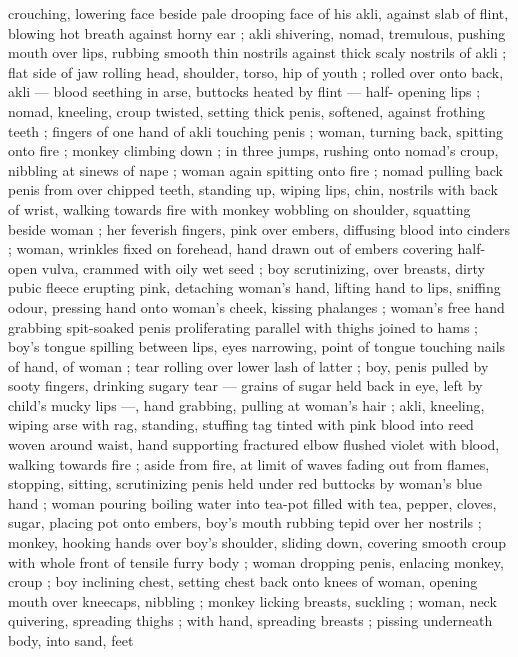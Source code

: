 crouching, lowering face beside pale drooping face of his akli,
against slab of flint, blowing hot breath against horny ear ; akli
shivering, nomad, tremulous, pushing mouth over lips, rubbing
smooth thin nostrils against thick scaly nostrils of akli ; flat side of
jaw rolling head, shoulder, torso, hip of youth ; rolled over onto back,
akli --- blood seething in arse, buttocks heated by flint --- half-
opening lips ; nomad, kneeling, croup twisted, setting thick penis,
softened, against frothing teeth ; fingers of one hand of akli
touching penis ; woman, turning back, spitting onto fire ; monkey
climbing down ; in three jumps, rushing onto nomad’s croup, nibbling
at sinews of nape ; woman again spitting onto fire ; nomad pulling
back penis from over chipped teeth, standing up, wiping lips, chin,
nostrils with back of wrist, walking towards fire with monkey wobbling
on shoulder, squatting beside woman ; her feverish fingers, pink over
embers, diffusing blood into cinders ; woman, wrinkles fixed on
forehead, hand drawn out of embers covering half-open vulva,
crammed with oily wet seed ; boy scrutinizing, over breasts, dirty
pubic fleece erupting pink, detaching woman's hand, lifting hand to
lips, sniffing odour, pressing hand onto woman's cheek, kissing
phalanges ; woman's free hand grabbing spit-soaked penis
proliferating parallel with thighs joined to hams ; boy's tongue
spilling between lips, eyes narrowing, point of tongue touching nails
of hand, of woman ; tear rolling over lower lash of latter ; boy, penis
pulled by sooty fingers, drinking sugary tear --- grains of sugar held
back in eye, left by child's mucky lips ---, hand grabbing, pulling at
woman's hair ; akli, kneeling, wiping arse with rag, standing, stuffing
tag tinted with pink blood into reed woven around waist, hand
supporting fractured elbow flushed violet with blood, walking
towards fire ; aside from fire, at limit of waves fading out from
flames, stopping, sitting, scrutinizing penis held under red buttocks
by woman's blue hand ; woman pouring boiling water into tea-pot
filled with tea, pepper, cloves, sugar, placing pot onto embers, boy's
mouth rubbing tepid over her nostrils ; monkey, hooking hands over
boy's shoulder, sliding down, covering smooth croup with whole front
of tensile furry body ; woman dropping penis, enlacing monkey,
croup ; boy inclining chest, setting chest back onto knees of woman,
opening mouth over kneecaps, nibbling ; monkey licking breasts,
suckling ; woman, neck quivering, spreading thighs ; with hand,
spreading breasts ; pissing underneath body, into sand, feet
